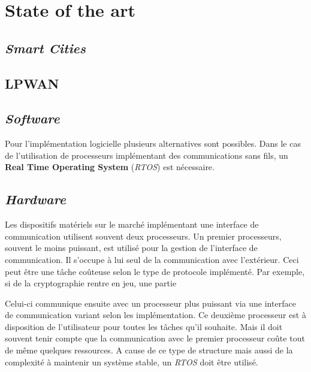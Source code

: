 \chapter{State of the art}
\label{2_state_of_the_art}


\section{\textit{Smart Cities}}



\section{LPWAN}



\section{\textit{Software}}

Pour l'implémentation logicielle plusieurs alternatives sont possibles. Dans le cas de l'utilisation de processeurs implémentant des communications sans fils, un \textbf{Real Time Operating System} (\textit{RTOS}) est nécessaire. 

\section{\textit{Hardware}}

Les dispositifs matériels sur le marché implémentant une interface de communication utilisent souvent deux processeurs. Un premier processeurs, souvent le moins puissant, est utilisé pour la gestion de l'interface de communication. Il s'occupe à lui seul de la communication avec l'extérieur. Ceci peut être une tâche coûteuse selon le type de protocole implémenté. Par exemple, si de la cryptographie rentre en jeu, une partie 

Celui-ci communique ensuite avec un processeur plus puissant via une interface de communication variant selon les implémentation. Ce deuxième processeur est à disposition de l'utilisateur pour toutes les tâches qu'il souhaite. Mais il doit souvent tenir compte que la communication avec le premier processeur coûte tout de même quelques ressources. A cause de ce type de structure mais aussi de la complexité à maintenir un système stable, un \textit{RTOS} doit être utilisé.\\


